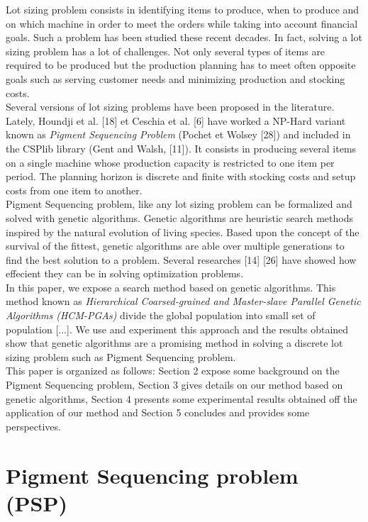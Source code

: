 \documentclass[twocolumn,10pt]{asme2ej}
\begin{document}
Lot sizing problem consists in identifying items to produce, when to produce and on which machine in order to meet the orders while taking into account financial goals. Such a problem has been studied these recent decades. In fact, solving a lot sizing problem has a lot of challenges. Not only several types of items are required to be produced but the production planning has to meet often opposite goals such as serving customer needs and minimizing production and stocking costs.\\
Several versions of lot sizing problems have been proposed in the literature. Lately,  Houndji et al. [18]
et Ceschia et al. [6] have worked a NP-Hard variant known as \emph{Pigment Sequencing Problem}  (Pochet
et Wolsey [28]) and included in the CSPlib library (Gent and Walsh, [11]). It consists in producing several items on a single machine whose production capacity is restricted to one item per period. The planning horizon is discrete and finite with stocking costs and setup costs from one item to another. \\
Pigment Sequencing problem, like any lot sizing problem can be formalized and solved with genetic algorithms. Genetic algorithms are heuristic search methods inspired by the natural evolution of living species. Based upon the concept of the survival of the fittest, genetic algorithms are able over multiple generations to find the best solution to a problem. Several researches [14] [26] have showed how effecient they can be in solving optimization problems. \\
In this paper, we expose a search method based on genetic algorithms. This method known as \emph{Hierarchical
Coarsed-grained and Master-slave Parallel Genetic Algorithms (HCM-PGAs)} divide the global population into small set of population [...]. We use and experiment this approach and the results obtained show that genetic algorithms are a promising method in solving a discrete lot sizing problem such as Pigment Sequencing problem.  \\
This paper is organized as follows: Section 2 expose some background on the Pigment Sequencing problem, Section 3 gives details on our method based on genetic algorithms, Section 4 presents some experimental results obtained off the application of our method and Section 5 concludes and provides some perspectives.


\section{Pigment Sequencing problem (PSP)}
\end{document}
